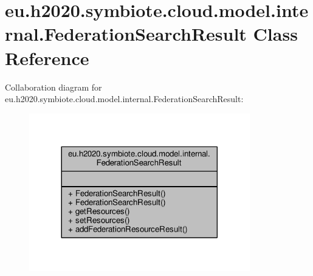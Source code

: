 \hypertarget{classeu_1_1h2020_1_1symbiote_1_1cloud_1_1model_1_1internal_1_1FederationSearchResult}{}\section{eu.\+h2020.\+symbiote.\+cloud.\+model.\+internal.\+Federation\+Search\+Result Class Reference}
\label{classeu_1_1h2020_1_1symbiote_1_1cloud_1_1model_1_1internal_1_1FederationSearchResult}


Collaboration diagram for eu.\+h2020.\+symbiote.\+cloud.\+model.\+internal.\+Federation\+Search\+Result\+:
\nopagebreak
\begin{figure}[H]
\begin{center}
\leavevmode
\includegraphics[width=272pt]{classeu_1_1h2020_1_1symbiote_1_1cloud_1_1model_1_1internal_1_1FederationSearchResult__coll__graph}
\end{center}
\end{figure}
